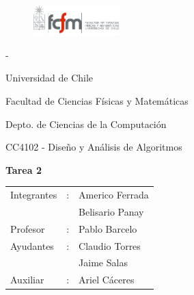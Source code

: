 \documentclass[letterpaper,10pt]{article}
\begin{document}
	\begin{titlepage}

		\begin{figure}
			\includegraphics[width=0.3\textwidth]{logoFCFM.png}
		\end{figure}

		\noindent \phantom - %

		Universidad de Chile

		Facultad de Ciencias Físicas y Matemáticas

		Depto. de Ciencias de la Computación

		CC4102 - Diseño y Análisis de Algoritmos

		\vfill

		\begin{center}
			\begin{Huge}
				{\textbf{Tarea 2}}
			\end{Huge}
		\end{center}

		\vfill

		\begin{flushright}
			\begin{tabular}{lll}
				Integrantes	&:	& Americo Ferrada\\
						&	& Belisario Panay\\
				Profesor	&:	& Pablo Barcelo\\
				Ayudantes	&:	& Claudio Torres\\
						&	& Jaime Salas\\
				Auxiliar	&:	& Ariel Cáceres\\
			\end{tabular}
		\end{flushright}

	\end{titlepage}

	\newpage

	\tableofcontents
\end{document}
